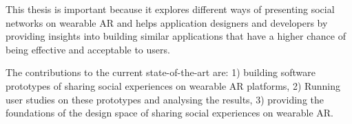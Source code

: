 This thesis is important because it explores different ways of presenting social networks on wearable AR and helps application designers and developers by providing insights into building similar applications that have a higher chance of being effective and acceptable to users. 

The contributions to the current state-of-the-art are: 1) building software prototypes of sharing social experiences on wearable AR platforms, 2) Running user studies on these prototypes and analysing the results, 3) providing the foundations of the design space of sharing social experiences on wearable AR. 





